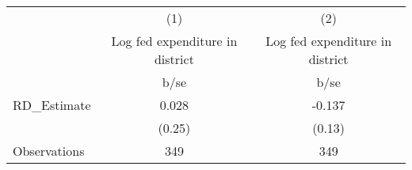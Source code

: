 {
\def\sym#1{\ifmmode^{#1}\else\(^{#1}\)\fi}
\begin{tabular}{l*{2}{c}}
\hline\hline
                    &\multicolumn{1}{c}{(1)}&\multicolumn{1}{c}{(2)}\\
                    &\multicolumn{1}{c}{Log fed expenditure in district }&\multicolumn{1}{c}{Log fed expenditure in district }\\
                    &        b/se         &        b/se         \\
\hline
RD\_Estimate         &       0.028         &      -0.137         \\
                    &      (0.25)         &      (0.13)         \\
\hline
Observations        &         349         &         349         \\
\hline\hline
\end{tabular}
}

